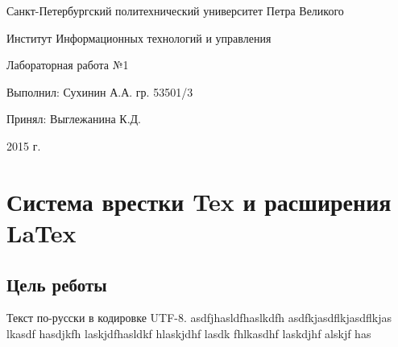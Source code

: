 \documentclass{article}
\begin{document}
\begin{titlepage} \begin{center}

	\Large			
Санкт-Петербургский политехнический университет Петра Великого
			
	\vspace{0.2cm}	
Институт Информационных технологий и управления
		
	\vspace{2cm} \vfill \huge
Лабораторная работа №1		
		
	\vfill 
	\begin{flushleft} \large \hangindent=8cm 
Выполнил: Сухинин А.А. гр. 53501/3 \hrulefill
			
Принял: Выглежанина К.Д. \hrulefill
	\end{flushleft}
		
	\vspace{2cm} \vfill \LARGE
2015 г.
		
\end{center} \end{titlepage}


\section{Система врестки Tex и расширения LaTex}

\subsection{Цель реботы}

Текст по-русски в кодировке UTF-8. asdfjhasldfhaslkdfh
 asdfkjasdflkjasdflkjas lkasdf hasdjkfh laskjdfhasldkf hlaskjdhf lasdk fhlkasdhf laskdjhf alskjf has

 
\end{document}
